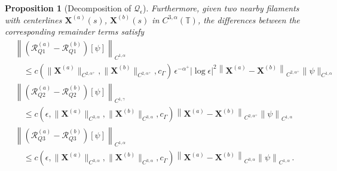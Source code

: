 \documentclass[11pt,reqno]{amsart}
\newcommand{\T}{\mathbb{T}}
\newcommand{\X}{\bm{X}}
\newcommand{\abs}[1]{\left\lvert #1 \right\rvert}
\newcommand{\norm}[1]{\left\lVert #1 \right\rVert}
\newcommand{\mc}[1]{\mathcal{#1}}
\newtheorem{proposition}[theorem]{Proposition}
\theoremstyle{definition}
\begin{document}
\begin{proposition}[Decomposition of $\mc{Q}_\epsilon$]
Furthermore, given two nearby filaments with centerlines $\X^{(a)}(s)$, $\X^{(b)}(s)$ in $C^{3,\alpha}(\T)$, the differences between the corresponding remainder terms satisfy 
\begin{equation}
\begin{aligned}
&\norm{(\mc{R}_{Q1}^{(a)}-\mc{R}_{Q1}^{(b)})[\psi]}_{C^{1,\alpha}} \\
&\quad\le 
  c(\|\X^{(a)}\|_{C^{2,\alpha^+}},\|\X^{(b)}\|_{C^{2,\alpha^+}},c_\Gamma)\, \epsilon^{-\alpha^+}\abs{\log\epsilon}^2\norm{\X^{(a)}-\X^{(b)}}_{C^{2,\alpha^+}}\|\psi\|_{C^{1,\alpha}}\\
%
%
&\norm{(\mc{R}_{Q2}^{(a)}-\mc{R}_{Q2}^{(b)})[\psi]}_{C^{1,\gamma}} \\
&\quad \le
  c(\epsilon,\|\X^{(a)}\|_{C^{3,\alpha}},\|\X^{(b)}\|_{C^{3,\alpha}},c_\Gamma)\norm{\X^{(a)}-\X^{(b)}}_{C^{2,\alpha^+}}\norm{\psi}_{C^{1,\alpha}}\\
%
%
&\norm{(\mc{R}_{Q3}^{(a)}-\mc{R}_{Q3}^{(b)})[\psi]}_{C^{1,\alpha}} \\
&\quad \le 
  c(\epsilon,\|\X^{(a)}\|_{C^{3,\alpha}},\|\X^{(b)}\|_{C^{3,\alpha}},c_\Gamma)\norm{\X^{(a)}-\X^{(b)}}_{C^{3,\alpha}}\norm{\psi}_{C^{1,\alpha}}\,.
\end{aligned}
\end{equation}
\end{proposition}
\end{document}
